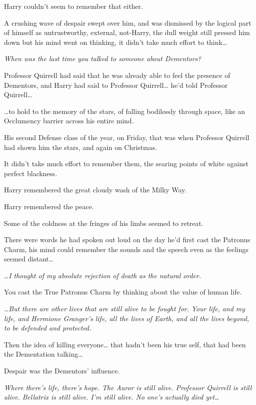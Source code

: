 Harry couldn't seem to remember that either.

A crushing wave of despair swept over him, and was dismissed by the logical part of himself as untrustworthy, external, not-Harry, the dull weight still pressed him down but his mind went on thinking, it didn't take much effort to think{\ldots}

\emph{When was the last time you talked to someone about Dementors?}

Professor Quirrell had said that he was already able to feel the presence of Dementors, and Harry had said to Professor Quirrell{\ldots} he'd told Professor Quirrell{\ldots}

{\ldots}to hold to the memory of the stars, of falling bodilessly through space, like an Occlumency barrier across his entire mind.

His second Defense class of the year, on Friday, that was when Professor Quirrell had shown him the stars, and again on Christmas.

It didn't take much effort to remember them, the searing points of white against perfect blackness.

Harry remembered the great cloudy wash of the Milky Way.

Harry remembered the peace.

Some of the coldness at the fringes of his limbs seemed to retreat.

There were words he had spoken out loud on the day he'd first cast the Patronus Charm, his mind could remember the sounds and the speech even as the feelings seemed distant{\ldots}

{\ldots}\emph{I thought of my absolute rejection of death as the natural order.}

You cast the True Patronus Charm by thinking about the value of human life.

\emph{{\ldots}But there are other lives that are still alive to be fought for. Your life, and my life, and Hermione Granger's life, all the lives of Earth, and all the lives beyond, to be defended and protected.}

Then the idea of killing everyone{\ldots} that hadn't been his true self, that had been the Dementation talking{\ldots}

Despair was the Dementors' influence.

\emph{Where there's life, there's hope. The Auror is still alive. Professor Quirrell is still alive. Bellatrix is still alive. I'm still alive. No one's actually died yet{\ldots}}

